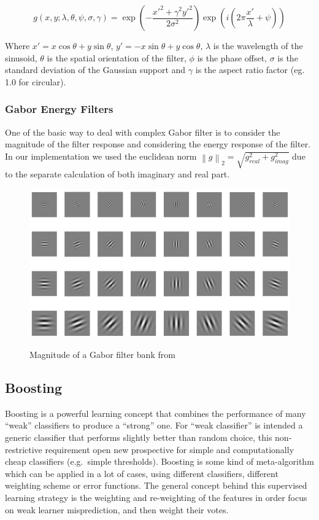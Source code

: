 \begin{equation}
g(x,y;\lambda,\theta,\psi,\sigma,\gamma) = \exp\left(-\frac{x'^2+\gamma^2y'^2}{2\sigma^2}\right)\exp\left(i\left(2\pi\frac{x'}{\lambda}+\psi\right)\right)
\end{equation}

Where $x' = x \cos\theta + y \sin\theta$, $y' = -x \sin\theta + y \cos\theta$, $\lambda$ is the wavelength of the sinusoid, $\theta$ is the spatial orientation of the filter, $\phi$ is the phase offset, $\sigma$ is the standard deviation of the Gaussian support and $\gamma$ is the aspect ratio factor (eg. 1.0 for circular).

\subsubsection*{Gabor Energy Filters}
One of the basic way to deal with complex Gabor filter is to consider the magnitude of the filter response and considering the energy response of the filter. In our implementation we used the euclidean norm $\left \| g \right \|_2 = \sqrt{ g_{real}^2+g_{imag}^2 }$ due to the separate calculation of both imaginary and real part.

\begin{figure}[!h]
\centering
\includegraphics[width=12cm]{images/gabor.png}
\label{fig:gabor}
\caption{Magnitude of a Gabor filter bank from \cite{gaborApplication} }
\end{figure}

\newpage
\subsection{Boosting}
\label{appr:boosting}

Boosting is a powerful learning concept that combines the performance of many ``weak'' classifiers to produce a ``strong'' one. For ``weak classifier'' is intended a generic classifier that performs slightly better than random choice, this non-restrictive requirement open new prospective for simple and computationally cheap classifiers (e.g.\ simple thresholds). Boosting is some kind of meta-algorithm which can be applied in a lot of cases, using different classifiers, different weighting scheme or error functions. The general concept behind this supervised learning strategy is the weighting and re-weighting of the features in order focus on weak learner misprediction, and then weight their votes\cite{rojas2009adaboost}.\\

